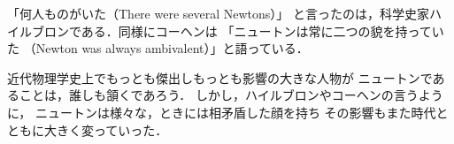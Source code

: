 \documentclass{jsarticle}
\begin{document}
「何人ものがいた（There were several Newtons）」
と言ったのは，科学史家ハイルブロンである．同様にコーヘンは
「ニュートンは常に二つの貌を持っていた
（Newton was always ambivalent）」と語っている．

近代物理学史上でもっとも傑出しもっとも影響の大きな人物が
ニュートンであることは，誰しも頷くであろう．
しかし，ハイルブロンやコーヘンの言うように，
ニュートンは様々な，ときには相矛盾した顔を持ち
その影響もまた時代とともに大きく変っていった．
\end{document}
